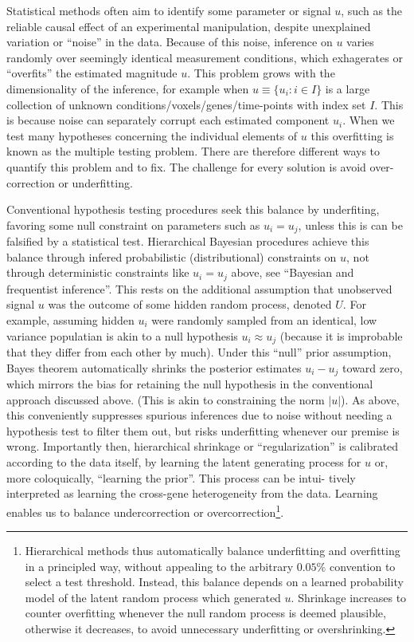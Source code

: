 \documentclass{article}
\begin{document}
Statistical methods often aim to identify some parameter or signal $u$, such as the reliable causal effect of an experimental manipulation, despite unexplained variation or ``noise'' in the data. Because of this noise, inference on $u$ varies randomly over seemingly identical measurement conditions, which exhagerates or ``overfits'' the estimated magnitude $u$. This problem grows with the dimensionality of the inference, for example when $u \equiv \{u_i: i \in I \}$ is a large collection of unknown conditions/voxels/genes/time-points with index set $I$. This is because noise can separately corrupt each estimated component $u_i$. When we test many hypotheses concerning the individual elements of $u$ this overfitting is known as the multiple testing problem. There are therefore different ways to quantify this problem and to fix. The challenge for every solution is avoid over-correction or underfitting.

Conventional hypothesis testing procedures seek this balance by underfiting, favoring some null constraint on parameters such as $u_i=u_j$, unless this is can be falsified by a statistical test. Hierarchical Bayesian procedures achieve this balance through infered  probabilistic (distributional) constraints on $u$, not through deterministic constraints like $u_i=u_j$ above, see ``Bayesian and frequentist inference''. This rests on the additional assumption that unobserved signal $u$ was the outcome of some hidden random process, denoted $U$. For example, assuming hidden $u_i$ were randomly sampled from an identical, low variance populatian is akin to a null hypothesis $u_i \approx u_j$ (because it is improbable that they differ from each other by much). Under this ``null'' prior assumption, Bayes theorem automatically shrinks the posterior estimates $u_i-u_j$ toward zero, which mirrors the bias for retaining the null hypothesis in the conventional approach discussed above. (This is akin to constraining the norm $|u|$). As above, this conveniently suppresses spurious inferences due to noise without needing a hypothesis test to filter them out, but risks underfitting whenever our premise is wrong. Importantly then, hierarchical shrinkage or ``regularization'' is calibrated according to the data itself, by learning the latent generating process for $u$  or, more coloquically, ``learning the prior''. This process can be intui- tively interpreted as learning the cross-gene heterogeneity from the data. Learning enables us to balance undercorrection or overcorrection\footnote{Hierarchical methods thus automatically balance underfitting and overfitting in a principled way, without appealing to the arbitrary $0.05\%$ convention to select a test threshold. Instead, this balance depends on a learned probability model of the latent random process which generated $u$. Shrinkage increases to counter overfitting whenever the null random process is deemed plausible, otherwise it decreases, to avoid unnecessary underfitting or overshrinking.}.
\end{document}
